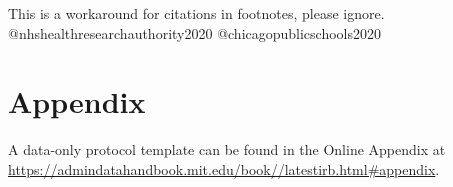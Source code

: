 \begin{invisible}
This is a workaround for citations in footnotes, please ignore.
@nhshealthresearchauthority2020 @chicagopublicschools2020
\end{invisible}

\putbib

\FloatBarrier\newpage

\hypertarget{appendix-1}{%
\section*{Appendix}\label{appendix-1}}

A data-only protocol template can be found in the Online Appendix at \url{https://admindatahandbook.mit.edu/book//latestirb.html#appendix}.

